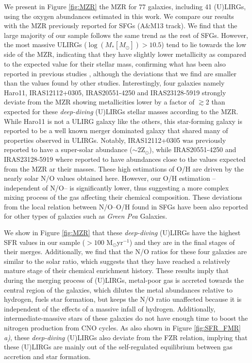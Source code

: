 \documentclass{nature2}
\begin{document}
We present in Figure \ref{fig:MZR} the MZR for 77 galaxies, including 41 (U)LIRGs, using the oxygen abundances estimated in this work. We compare our results with the MZR previously reported for SFGs\cite{Andrews_Martini_2013} (A\&M13 track).
We find that the large majority of our sample follows the same trend as the rest of SFGs. However, the most massive ULIRGs (\ensuremath{\log(M_{*} [M_{\odot}]) > 10.5}) tend to lie towards the low side of the MZR, indicating that they have slightly lower metallicity as compared to the expected value for their stellar mass, confirming what has been also reported  in previous studies \cite{Pereira-Santaella_2017}, although the deviations that we find  are smaller than the values found by other studies\cite{Rupke_2008}. Interestingly, four galaxies namely Haro11, IRAS12112+0305, IRAS20551-4250 and IRAS23128-5919 strongly deviate from the MZR showing metallicities lower by a factor of \ensuremath{\gtrsim}2 than expected for these {\it deep-diving} (U)LIRGs stellar masses according to the MZR. While Haro11 is not a ULIRG galaxy like the others, this star-forming galaxy is reported to be a well known merger dominated galaxy that shared many of properties\cite{Ostlin_2015, Ostlin_2021} observed in ULIRGs. Notably, IRAS12112+0305 was previously reported to have a super-solar abundance (\ensuremath{\sim}2Z\ensuremath{_{\odot}})\cite{Chartab_2022}, while IRAS20551-4250 and IRAS23128-5919 where reported to have abundances close to the values expected from the MZR ar their masses\cite{Herrera-Camus_2018}. These high estimations of O/H are driven by the nearly solar N/O values obtained  here. However, our O/H estimation -- independent of N/O-- is significantly lower, thus suggesting a more complex mixing process of the gas affecting their chemical composition. These deviations from the local relation between N/O--O/H found in SFGs have been also reported for other types of galaxies such as {\it Green Pea} Galaxies\cite{Amorin_2010}.

We show in Figure \ref{fig:MZR} that these {\it deep-diving} (U)LIRGs have the highest SFR values in our sample (\ensuremath{>100} M\ensuremath{_{\odot}}yr\ensuremath{^{-1}}) and they are in the final stages of their merges. Additionally, we find that the N/O ratios for these four galaxies are similar to the solar ratio, which suggests that they have reached a relatively mature stage of their chemical enrichment history\cite{Amorin_2010, Perez-Montero_2013}. These results imply that during the merging process of (U)LIRGs, metal-poor gas is accreted towards the central region of the galaxies, which dilutes the metal abundances relative to hydrogen, fuels star formation, but keeps the N/O ratio unaffected because it is independent of the effects of a massive infall of hydrogen. Additionally, intermediate-massive stars of these galaxies do not have enough time to boost the nitrogen production from CNO cycles\cite{Vincenzo_Kobayashi_2018}. As also shown in Figure \ref{fig:SFR_FMR} {\it a)}, these {\it deep-diving} (U)LIRGs also deviate from the FZR relation, implying that these (U)LIRGs are mainly out of the self-regulated equilibrium between gas accretion and star formation.
\end{document}
